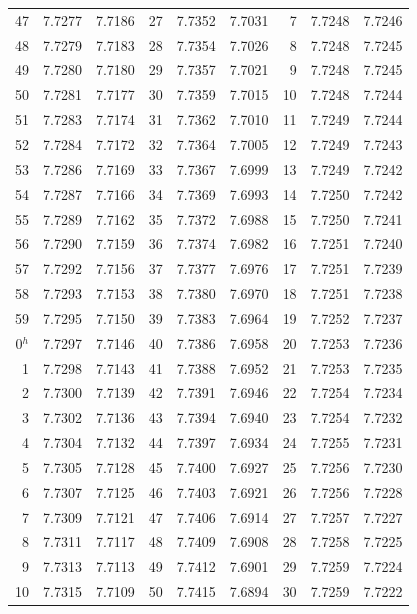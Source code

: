 \documentclass[10pt,a4paper]{article}
\begin{document}
\begin{center}
\begin{longtable}{@{}r@{\hspace{0.8em}}r@{\hspace{0.8em}}r@{\hspace{1.5em}}r@{\hspace{0.8em}}r@{\hspace{0.8em}}r@{\hspace{1.5em}}r@{\hspace{0.8em}}r@{\hspace{0.8em}}r@{}}
47 & 7.7277 & 7.7186 & 27 & 7.7352 & 7.7031 & 7 & 7.7248 & 7.7246 \\
48 & 7.7279 & 7.7183 & 28 & 7.7354 & 7.7026 & 8 & 7.7248 & 7.7245 \\
49 & 7.7280 & 7.7180 & 29 & 7.7357 & 7.7021 & 9 & 7.7248 & 7.7245 \\
50 & 7.7281 & 7.7177 & 30 & 7.7359 & 7.7015 & 10 & 7.7248 & 7.7244 \\
51 & 7.7283 & 7.7174 & 31 & 7.7362 & 7.7010 & 11 & 7.7249 & 7.7244 \\
52 & 7.7284 & 7.7172 & 32 & 7.7364 & 7.7005 & 12 & 7.7249 & 7.7243 \\
53 & 7.7286 & 7.7169 & 33 & 7.7367 & 7.6999 & 13 & 7.7249 & 7.7242 \\
54 & 7.7287 & 7.7166 & 34 & 7.7369 & 7.6993 & 14 & 7.7250 & 7.7242 \\
55 & 7.7289 & 7.7162 & 35 & 7.7372 & 7.6988 & 15 & 7.7250 & 7.7241 \\
56 & 7.7290 & 7.7159 & 36 & 7.7374 & 7.6982 & 16 & 7.7251 & 7.7240 \\
57 & 7.7292 & 7.7156 & 37 & 7.7377 & 7.6976 & 17 & 7.7251 & 7.7239 \\
58 & 7.7293 & 7.7153 & 38 & 7.7380 & 7.6970 & 18 & 7.7251 & 7.7238 \\
59 & 7.7295 & 7.7150 & 39 & 7.7383 & 7.6964 & 19 & 7.7252 & 7.7237 \\
0$^h$ & 7.7297 & 7.7146 & 40 & 7.7386 & 7.6958 & 20 & 7.7253 & 7.7236 \\
1 & 7.7298 & 7.7143 & 41 & 7.7388 & 7.6952 & 21 & 7.7253 & 7.7235 \\
2 & 7.7300 & 7.7139 & 42 & 7.7391 & 7.6946 & 22 & 7.7254 & 7.7234 \\
3 & 7.7302 & 7.7136 & 43 & 7.7394 & 7.6940 & 23 & 7.7254 & 7.7232 \\
4 & 7.7304 & 7.7132 & 44 & 7.7397 & 7.6934 & 24 & 7.7255 & 7.7231 \\
5 & 7.7305 & 7.7128 & 45 & 7.7400 & 7.6927 & 25 & 7.7256 & 7.7230 \\
6 & 7.7307 & 7.7125 & 46 & 7.7403 & 7.6921 & 26 & 7.7256 & 7.7228 \\
7 & 7.7309 & 7.7121 & 47 & 7.7406 & 7.6914 & 27 & 7.7257 & 7.7227 \\
8 & 7.7311 & 7.7117 & 48 & 7.7409 & 7.6908 & 28 & 7.7258 & 7.7225 \\
9 & 7.7313 & 7.7113 & 49 & 7.7412 & 7.6901 & 29 & 7.7259 & 7.7224 \\
10 & 7.7315 & 7.7109 & 50 & 7.7415 & 7.6894 & 30 & 7.7259 & 7.7222 \\

\end{longtable}
\end{center}
\end{document}
